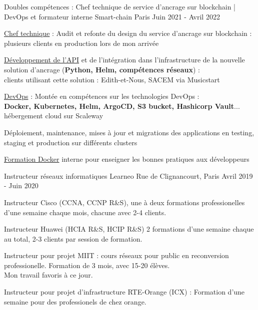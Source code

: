 
\begin{cventries}
  \cventry
    {Doubles compétences : Chef technique de service d'ancrage sur blockchain | DevOps et formateur interne} %
    {Smart-chain} %
    {Paris} %
    {Juin 2021 - Avril 2022} %
    {
      \begin{cvitems} %
      {
        \item {\underline{Chef technique} : Audit et refonte du design du service d'ancrage sur blockchain :\\plusieurs clients en production lors de mon arrivée}
        \item {\underline{Développement de l'API} et de l'intégration dans l'infrastructure de la nouvelle solution d'ancrage (\textbf{Python, Helm, compétences réseaux}) :\\clients utilisant cette solution : Edith-et-Nous, SACEM via Musicstart}
        \item {\underline{DevOps} : Montée en compétences sur les technologies DevOps :\\\textbf{Docker, Kubernetes, Helm, ArgoCD, S3 bucket, Hashicorp Vault}... hébergement cloud sur Scaleway}
        \item {Déploiement, maintenance, mises à jour et migrations des applications en testing, staging et production sur différents clusters}
        \item {\underline{Formation Docker} interne pour enseigner les bonnes pratiques aux développeurs}
      }
      \end{cvitems}
    }

  \cventry
    {Instructeur réseaux informatiques} %
    {Learneo} %
    {Rue de Clignancourt, Paris} %
    {Avril 2019 - Juin 2020} %
    {
      \begin{cvitems} %
      {
        \item {Instructeur Cisco (CCNA, CCNP R\&S), une à deux formations professionelles d'une semaine chaque mois, chacune avec 2-4 clients.}
        \item {Instructeur Huawei (HCIA R\&S, HCIP R\&S) 2 formations d'une semaine chaque au total, 2-3 clients par session de formation.}
        \item {Instructeur pour projet MIIT : cours réseaux pour public en reconversion professionelle. Formation de 3 mois, avec 15-20 élèves.\\Mon travail favoris à ce jour.}
        \item {Instructeur pour projet d'infrastructure RTE-Orange (ICX) : Formation d'une semaine pour des professionels de chez orange.}
      }
      \end{cvitems}
    }


\end{cventries}
